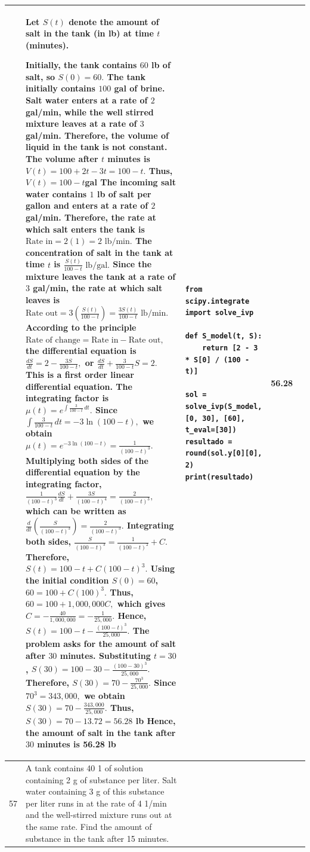 \documentclass[a4paper,12pt]{article}
\begin{document}
\begin{longtable}{|p{0.3cm}|p{}|p{10cm}|p{}|p{1.5cm}|}
              &Let $S(t)$ denote the amount of salt in the tank (in lb) at time $t$ (minutes).

Initially, the tank contains $60$ lb of salt, so
$S(0)=60.$
The tank initially contains $100$ gal of brine. Salt water enters at a rate of $2$ gal/min, while the well stirred mixture leaves at a rate of $3$ gal/min.
Therefore, the volume of liquid in the tank is not constant. The volume after $t$ minutes is
$V(t)=100+2t-3t=100-t.$
Thus, $V(t)=100-t$gal
The incoming salt water contains $1$ lb of salt per gallon and enters at a rate of $2$ gal/min. Therefore, the rate at which salt enters the tank is
$\text{Rate in}=2(1)=2\text{ lb/min}.$ The concentration of salt in the tank at time $t$ is
$\frac{S(t)}{100-t}\text{ lb/gal}.$
Since the mixture leaves the tank at a rate of $3$ gal/min, the rate at which salt leaves is $\text{Rate out}=3\left(\frac{S(t)}{100-t}\right)
=\frac{3S(t)}{100-t}\text{ lb/min}.$
According to the principle
$\text{Rate of change}=\text{Rate in}-\text{Rate out},$
the differential equation is $\frac{dS}{dt}=2-\frac{3S}{100-t},$
or $\frac{dS}{dt}+\frac{3}{100-t}S=2.$ This is a first order linear differential equation.
The integrating factor is $\mu(t)=e^{\int\frac{3}{100-t}\,dt}.$
Since $\int\frac{3}{100-t}\,dt=-3\ln(100-t),$ we obtain $\mu(t)=e^{-3\ln(100-t)}
=\frac{1}{(100-t)^3}.$ Multiplying both sides of the differential equation by the integrating factor, $\frac{1}{(100-t)^3}\frac{dS}{dt}
+\frac{3S}{(100-t)^4}=\frac{2}{(100-t)^3},$
which can be written as $\frac{d}{dt}\left(\frac{S}{(100-t)^3}\right)
=\frac{2}{(100-t)^3}.$ Integrating both sides, $\frac{S}{(100-t)^3}=\frac{1}{(100-t)^2}+C.$
Therefore, $S(t)=100-t+C(100-t)^3.$
Using the initial condition $S(0)=60$, $60=100+C(100)^3.$
Thus, $60=100+1,000,000C,$ which gives $C=-\frac{40}{1,000,000}=-\frac{1}{25,000}.$
Hence, $S(t)=100-t-\frac{(100-t)^3}{25,000}.$
The problem asks for the amount of salt after $30$ minutes. Substituting $t=30$,
$S(30)=100-30-\frac{(100-30)^3}{25,000}.$
Therefore, $S(30)=70-\frac{70^3}{25,000}.$ Since $70^3=343,000,$ we obtain $S(30)=70-\frac{343,000}{25,000}.$ Thus, $S(30)=70-13.72=56.28$ lb
Hence, the amount of salt in the tank after $30$ minutes is 56.28 lb

 &\begin{verbatim}
from scipy.integrate import solve_ivp

def S_model(t, S):
    return [2 - 3 * S[0] / (100 - t)]

sol = solve_ivp(S_model, [0, 30], [60], t_eval=[30])
resultado = round(sol.y[0][0], 2)
print(resultado)
\end{verbatim}& 56.28 \\ \hline 
 57           & A tank contains 40 1 of solution containing 2 g of substance per liter. Salt water containing 3 g of this substance
per liter runs in at the rate of 4 1/min and the well-stirred mixture runs out at the same rate. Find the amount of
substance in the tank after 15 minutes.



\end{longtable}
\end{document}
